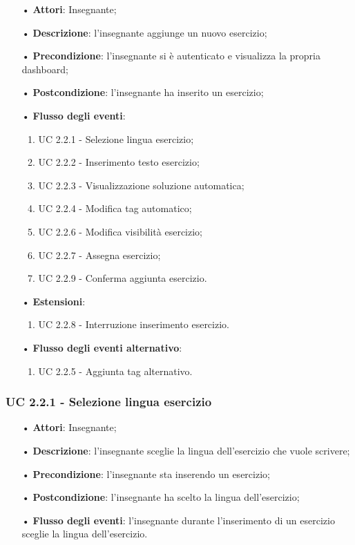 \begin{itemize}
	\item[•] \textbf{Attori}: Insegnante;
	\item[•] \textbf{Descrizione}: l'insegnante aggiunge un nuovo esercizio;
	\item[•] \textbf{Precondizione}: l'insegnante si è autenticato e visualizza la propria dashboard;
	\item[•] \textbf{Postcondizione}: l'insegnante ha inserito un esercizio;
	\item[•] \textbf{Flusso degli eventi}:
	\begin{enumerate}
		\item UC 2.2.1 - Selezione lingua esercizio;
		\item UC 2.2.2 - Inserimento testo esercizio;
		\item UC 2.2.3 - Visualizzazione soluzione automatica;
		\item UC 2.2.4 - Modifica {tag} automatico;
		\item UC 2.2.6 - Modifica visibilità esercizio;
		\item UC 2.2.7 - Assegna esercizio;
		\item UC 2.2.9 - Conferma aggiunta esercizio.
	\end{enumerate}
	\item[•] \textbf{Estensioni}:	
	\begin{enumerate}
		\item UC 2.2.8 - Interruzione inserimento esercizio.
	\end{enumerate}
	\item[•] \textbf{Flusso degli eventi alternativo}:
	\begin{enumerate}
		\item UC 2.2.5 - Aggiunta tag alternativo.
	\end{enumerate}
\end{itemize}
 

\subsubsection{UC 2.2.1 - Selezione lingua esercizio}
\begin{itemize}
	\item[•] \textbf{Attori}: Insegnante;
	\item[•] \textbf{Descrizione}: l'insegnante sceglie la lingua dell'esercizio che vuole scrivere;
	\item[•] \textbf{Precondizione}: l'insegnante sta inserendo un esercizio;
	\item[•] \textbf{Postcondizione}: l'insegnante ha scelto la lingua dell'esercizio;
	\item[•] \textbf{Flusso degli eventi}: l'insegnante durante l'inserimento di un esercizio sceglie la lingua dell'esercizio.
\end{itemize}

